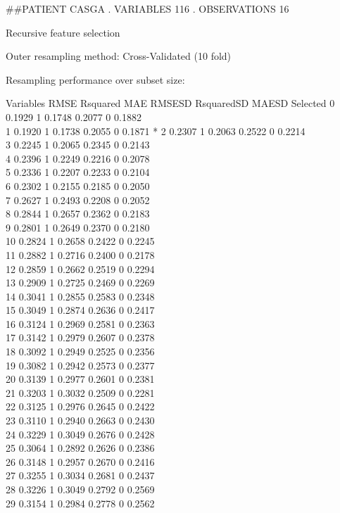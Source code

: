 \documentclass[
]{article}
\begin{document}
\#\#PATIENT CASGA . VARIABLES 116 . OBSERVATIONS 16

Recursive feature selection

Outer resampling method: Cross-Validated (10 fold)

Resampling performance over subset size:

Variables RMSE Rsquared MAE RMSESD RsquaredSD MAESD Selected 0 0.1929 1
0.1748 0.2077 0 0.1882\\
1 0.1920 1 0.1738 0.2055 0 0.1871 * 2 0.2307 1 0.2063 0.2522 0 0.2214\\
3 0.2245 1 0.2065 0.2345 0 0.2143\\
4 0.2396 1 0.2249 0.2216 0 0.2078\\
5 0.2336 1 0.2207 0.2233 0 0.2104\\
6 0.2302 1 0.2155 0.2185 0 0.2050\\
7 0.2627 1 0.2493 0.2208 0 0.2052\\
8 0.2844 1 0.2657 0.2362 0 0.2183\\
9 0.2801 1 0.2649 0.2370 0 0.2180\\
10 0.2824 1 0.2658 0.2422 0 0.2245\\
11 0.2882 1 0.2716 0.2400 0 0.2178\\
12 0.2859 1 0.2662 0.2519 0 0.2294\\
13 0.2909 1 0.2725 0.2469 0 0.2269\\
14 0.3041 1 0.2855 0.2583 0 0.2348\\
15 0.3049 1 0.2874 0.2636 0 0.2417\\
16 0.3124 1 0.2969 0.2581 0 0.2363\\
17 0.3142 1 0.2979 0.2607 0 0.2378\\
18 0.3092 1 0.2949 0.2525 0 0.2356\\
19 0.3082 1 0.2942 0.2573 0 0.2377\\
20 0.3139 1 0.2977 0.2601 0 0.2381\\
21 0.3203 1 0.3032 0.2509 0 0.2281\\
22 0.3125 1 0.2976 0.2645 0 0.2422\\
23 0.3110 1 0.2940 0.2663 0 0.2430\\
24 0.3229 1 0.3049 0.2676 0 0.2428\\
25 0.3064 1 0.2892 0.2626 0 0.2386\\
26 0.3148 1 0.2957 0.2670 0 0.2416\\
27 0.3255 1 0.3034 0.2681 0 0.2437\\
28 0.3226 1 0.3049 0.2792 0 0.2569\\
29 0.3154 1 0.2984 0.2778 0 0.2562\\
\end{document}
